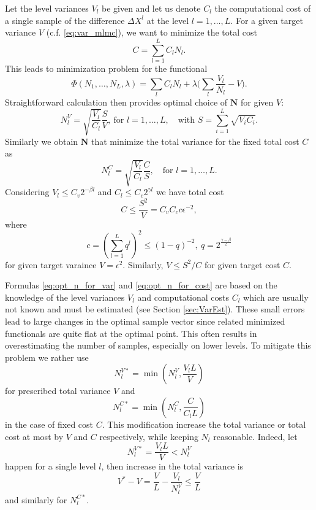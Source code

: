 \documentclass{article}
\def\vc#1{\mathbf{\boldsymbol{#1}}}     %
\begin{document}
Let  the level variances $V_l$ be given and let us denote $C_l$ the computational cost of a single sample of the difference $\Delta X^l$ at the level $l=1,\dots, L$. For a given target variance $V$ (c.f. \eqref{eq:var_mlmc}), we want to minimize the total cost
\begin{equation}
    \label{eq:total_cost}
	C = \sum_{l=1}^{L} C_l N_l.
\end{equation}
This leads to minimization problem for the functional
\[
	\Phi(N_1, \dots, N_L,\lambda) = \sum_l C_l N_l + \lambda \Big(\sum_l \frac{V_l}{N_l} - V\Big).
\]
Straightforward calculation then provides optimal choice of $\vc N$ for given $V$:
\begin{equation}
	\label{eq:opt_n_for_var}
	N_l^V = \sqrt{\frac{V_l}{C_l}} \frac{S}{V},\ \text{for }l=1,\dots, L,\quad \text{with } S = \sum_{i=1}^L \sqrt{V_i C_i}.
\end{equation}
Similarly we obtain $\vc N$ that minimize the total variance for the fixed total cost $C$ as
\begin{equation}
	\label{eq:opt_n_for_cost}
	N_l^C = \sqrt{\frac{V_l}{C_l}} \frac{C}{S}
	, \quad \text{for }l=1,\dots, L.
\end{equation}
Considering $V_l \le C_{v} 2^{-\beta l}$ and $C_l \le C_{c} 2^{\gamma l}$ we have total cost
\[
   C \le \frac{S^2}{V} = C_v C_c c \epsilon^{-2},
\]
where 
\[ 
   c = \left(\sum_{l=1}^{L} q^l\right)^2 \le (1-q)^{-2},\ q=2^\frac{\gamma - \beta}{2}
\]
for given target varaince $V=\epsilon^2$. Similarly, $V \le S^2 / C$ for given target cost $C$.



Formulas \eqref{eq:opt_n_for_var} and \eqref{eq:opt_n_for_cost} are based on the knowledge of the level variances $V_l$ and computational costs $C_l$ which are usually not known and must be estimated (see Section \ref{sec:VarEst}). These small errors lead to large changes in the optimal sample vector since related minimized functionals are quite flat at the optimal point.  This often results in overestimating the number of samples, especially on lower levels. To mitigate this problem we rather use
\[
	N_l^{V*} = \min( N_l^V, \frac{V_l L}{V} )
\]
for prescribed total variance $V$ and
\[
	N_l^{C*} = \min( N_l^C, \frac{C}{C_l L} )
\]
in the case of fixed cost $C$. This modification increase the total variance or total cost at most by $V$ and $C$ respectively, while keeping  $N_l$ reasonable. Indeed, let
\[
	N_l^{V*} = \frac{V_l L}{V} < N_l^V 
\]
happen for a single level $l$, then increase in the total variance is
\[
    V^* - V = \frac{V}{L} - \frac{V_l}{N_l^V} \le \frac{V}{L}
\]
and similarly for $N_l^{C*}$.
\end{document}

